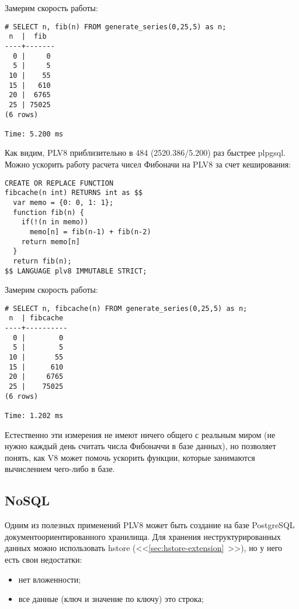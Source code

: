 Замерим скорость работы:

\begin{lstlisting}[label=lst:plv8js4,caption=Скорость расчета числа Фибоначчи на plv8]
# SELECT n, fib(n) FROM generate_series(0,25,5) as n;
 n  |  fib
----+-------
  0 |     0
  5 |     5
 10 |    55
 15 |   610
 20 |  6765
 25 | 75025
(6 rows)

Time: 5.200 ms
\end{lstlisting}

Как видим, PLV8 приблизительно в 484 (2520.386/5.200) раз быстрее plpgsql. Можно ускорить работу расчета чисел Фибоначи на PLV8 за счет кеширования:

\begin{lstlisting}[label=lst:plv8js5,caption=Фибоначчи на plv8]
CREATE OR REPLACE FUNCTION
fibcache(n int) RETURNS int as $$
  var memo = {0: 0, 1: 1};
  function fib(n) {
    if(!(n in memo))
      memo[n] = fib(n-1) + fib(n-2)
    return memo[n]
  }
  return fib(n);
$$ LANGUAGE plv8 IMMUTABLE STRICT;
\end{lstlisting}

Замерим скорость работы:

\begin{lstlisting}[label=lst:plv8js6,caption=Скорость расчета числа Фибоначчи на plv8]
# SELECT n, fibcache(n) FROM generate_series(0,25,5) as n;
 n  | fibcache
----+----------
  0 |        0
  5 |        5
 10 |       55
 15 |      610
 20 |     6765
 25 |    75025
(6 rows)

Time: 1.202 ms
\end{lstlisting}

Естественно эти измерения не имеют ничего общего с реальным миром (не нужно каждый день считать числа Фибоначчи в базе данных), но позволяет понять, как V8 может помочь ускорить функции, которые занимаются вычислением чего-либо в базе.

\subsection{NoSQL}

Одним из полезных применений PLV8 может быть создание на базе PostgreSQL документоориентированного хранилища. Для хранения неструктурированных данных можно использовать hstore (<<\ref{sec:hstore-extension}~>>), но у него есть свои недостатки:

\begin{itemize}
  \item нет вложенности;
  \item все данные (ключ и значение по ключу) это строка;
\end{itemize}

